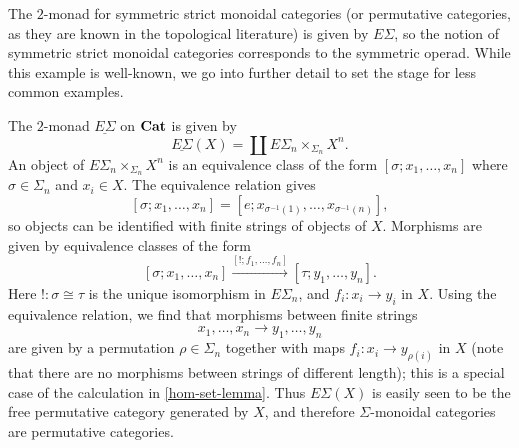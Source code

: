 \begin{example}
The $2$-monad for symmetric strict monoidal categories (or permutative categories, as they are known in the topological literature) is given by $E\Sigma$, so the notion of symmetric strict monoidal categories corresponds to the symmetric operad. While this example is well-known, we go into further detail to set the stage for less common examples.

The $2$-monad $\underline{E\Sigma}$ on $\mathbf{Cat}$ is given by
  \[
    \underline{E\Sigma} (X) = \coprod E\Sigma_{n} \times_{\Sigma_{n}} X^{n}.
  \]
An object of $E\Sigma_{n} \times_{\Sigma_{n}} X^{n}$ is an equivalence class of the form $[\sigma; x_{1}, \ldots, x_{n}]$ where $\sigma \in \Sigma_{n}$ and $x_{i} \in X$. The equivalence relation gives
  \[
    [\sigma; x_{1}, \ldots, x_{n}] = \left[e; x_{\sigma^{-1}(1)}, \ldots, x_{\sigma^{-1}(n)}\right],
  \]
so objects can be identified with finite strings of objects of $X$. Morphisms are given by equivalence classes of the form
  \[
    [\sigma; x_{1}, \ldots, x_{n}] \stackrel{[!; f_{1}, \ldots, f_{n}]}{\longrightarrow} [\tau; y_{1}, \ldots, y_{n}].
  \]
Here $! \colon \sigma \cong \tau$ is the unique isomorphism in $E \Sigma_{n}$, and $f_{i} \colon x_{i} \rightarrow y_{i}$ in $X$. Using the equivalence relation, we find that morphisms between finite strings
  \[
    x_{1}, \ldots, x_{n} \rightarrow y_{1}, \ldots, y_{n}
  \]
are given by a permutation $\rho \in \Sigma_{n}$ together with maps $f_{i} \colon x_{i} \rightarrow y_{\rho(i)}$ in $X$ (note that there are no morphisms between strings of different length); this is a special case of the calculation in \cref{hom-set-lemma}. Thus $E \Sigma(X)$ is easily seen to be the free permutative category generated by $X$, and therefore $\Sigma$-monoidal categories are permutative categories.
\end{example}

